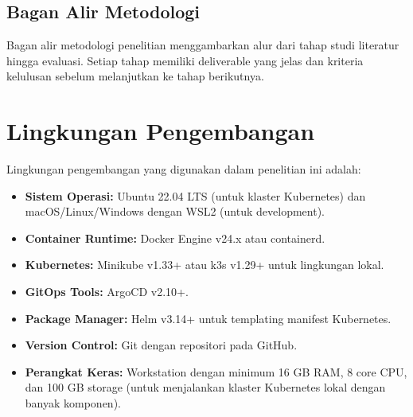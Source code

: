 
\subsection{Bagan Alir Metodologi}


Bagan alir metodologi penelitian menggambarkan alur dari tahap studi literatur hingga evaluasi. Setiap tahap memiliki deliverable yang jelas dan kriteria kelulusan sebelum melanjutkan ke tahap berikutnya.

\section{Lingkungan Pengembangan}

Lingkungan pengembangan yang digunakan dalam penelitian ini adalah:

\begin{itemize}
    \item \textbf{Sistem Operasi:} Ubuntu 22.04 LTS (untuk klaster Kubernetes) dan macOS/Linux/Windows dengan WSL2 (untuk development).
    \item \textbf{Container Runtime:} Docker Engine v24.x atau containerd.
    \item \textbf{Kubernetes:} Minikube v1.33+ atau k3s v1.29+ untuk lingkungan lokal.
    \item \textbf{GitOps Tools:} ArgoCD v2.10+.
    \item \textbf{Package Manager:} Helm v3.14+ untuk templating manifest Kubernetes.
    \item \textbf{Version Control:} Git dengan repositori pada GitHub.
    \item \textbf{Perangkat Keras:} Workstation dengan minimum 16 GB RAM, 8 core CPU, dan 100 GB storage (untuk menjalankan klaster Kubernetes lokal dengan banyak komponen).
\end{itemize}

